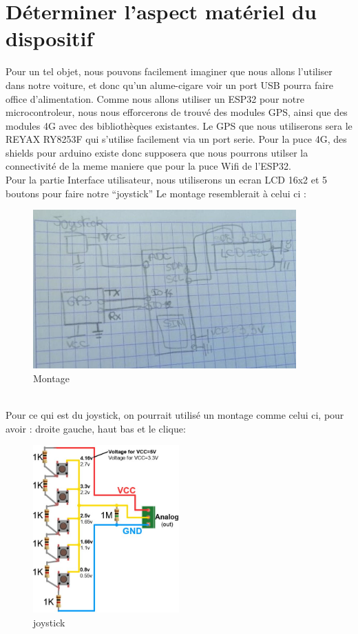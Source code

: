 \documentclass[10pt,a4paper]{article}
\begin{document}
\section{Déterminer l'aspect matériel du dispositif}
 
 Pour un tel objet, nous pouvons facilement imaginer que nous allons l'utiliser dans notre voiture, et donc qu'un alume-cigare voir un port USB pourra faire office d'alimentation. 
 Comme nous allons utiliser un ESP32 pour notre microcontroleur, nous nous efforcerons de trouvé des modules GPS, ainsi que des modules 4G avec des bibliothèques existantes.
 Le GPS que nous utiliserons sera le REYAX RY8253F qui s'utilise facilement via un port serie. 
 Pour la puce 4G, des shields pour arduino existe donc supposera que nous pourrons utilser la connectivité de la meme maniere que pour la puce Wifi de l'ESP32.\\
 Pour la partie Interface utilisateur, nous utiliserons un ecran LCD 16x2 et 5 boutons pour faire notre ``joystick''
 Le montage resemblerait à celui ci :\\
 \begin{figure}[h!]
\centering
\includegraphics[width=0.9\textwidth]{2.jpg}
\caption{Montage}
\label{fig:universe}
\end{figure}\\
Pour ce qui est du joystick, on pourrait utilisé un montage comme celui ci, pour avoir : droite gauche, haut bas et le clique:\\
\begin{figure}[h!]
\centering
\includegraphics[width=0.5\textwidth]{3.jpg}
\caption{joystick}
\label{fig:universe}
\end{figure}
 \newpage
\end{document}
